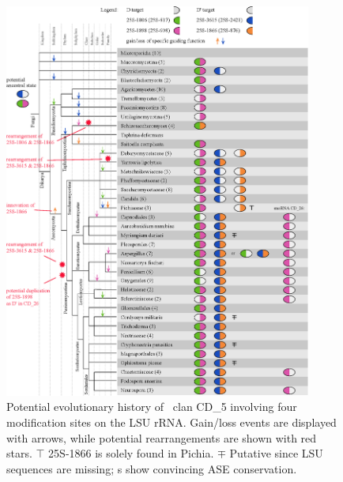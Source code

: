 \begin{figure}
  \centering
  \includegraphics[width=0.9\textwidth]{pics/target_switches_CD_5.eps}
  \caption[Potential evolutionary history of \sno\ clan
  CD\_5.]{Potential evolutionary history of \sno\ clan CD\_5 involving
  four modification sites on the LSU rRNA. Gain/loss events
  are displayed with arrows, while potential rearrangements are shown
  with red stars. $\top$ 25S-1866 is solely found in Pichia. $\mp$ Putative since LSU sequences are missing; \sno s show convincing
ASE conservation.}
  \label{fig:CD_5}
\end{figure}

